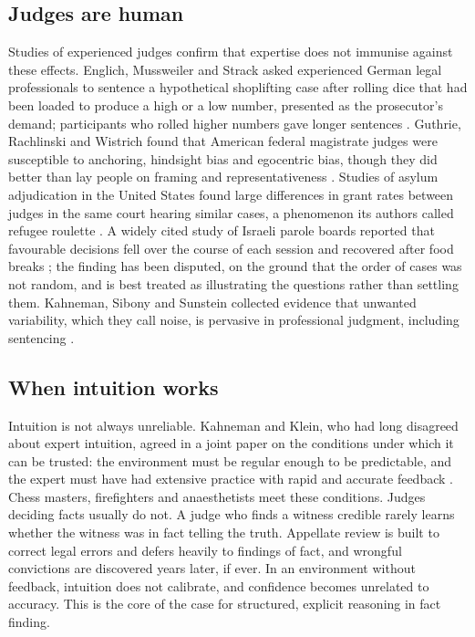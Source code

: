 \subsection{Judges are human}

Studies of experienced judges confirm that expertise does not immunise against these effects. Englich, Mussweiler and Strack asked experienced German legal professionals to sentence a hypothetical shoplifting case after rolling dice that had been loaded to produce a high or a low number, presented as the prosecutor's demand; participants who rolled higher numbers gave longer sentences \citep{englich2006}. Guthrie, Rachlinski and Wistrich found that American federal magistrate judges were susceptible to anchoring, hindsight bias and egocentric bias, though they did better than lay people on framing and representativeness \citep{guthrie2001}. Studies of asylum adjudication in the United States found large differences in grant rates between judges in the same court hearing similar cases, a phenomenon its authors called refugee roulette \citep{ramji2007}. A widely cited study of Israeli parole boards reported that favourable decisions fell over the course of each session and recovered after food breaks \citep{danziger2011}; the finding has been disputed, on the ground that the order of cases was not random, and is best treated as illustrating the questions rather than settling them. Kahneman, Sibony and Sunstein collected evidence that unwanted variability, which they call noise, is pervasive in professional judgment, including sentencing \citep{kahneman2021}.

\subsection{When intuition works}

Intuition is not always unreliable. Kahneman and Klein, who had long disagreed about expert intuition, agreed in a joint paper on the conditions under which it can be trusted: the environment must be regular enough to be predictable, and the expert must have had extensive practice with rapid and accurate feedback \citep{kahneman2009}. Chess masters, firefighters and anaesthetists meet these conditions. Judges deciding facts usually do not. A judge who finds a witness credible rarely learns whether the witness was in fact telling the truth. Appellate review is built to correct legal errors and defers heavily to findings of fact, and wrongful convictions are discovered years later, if ever. In an environment without feedback, intuition does not calibrate, and confidence becomes unrelated to accuracy. This is the core of the case for structured, explicit reasoning in fact finding.

